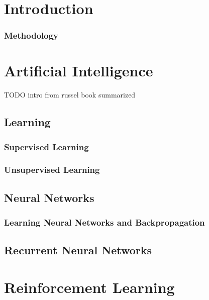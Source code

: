 \chapter{Introduction}

\subsection{Methodology}


\chapter{Artificial Intelligence}

 TODO intro from russel book summarized 
\section{Learning}

\subsection{Supervised Learning}

\subsection{Unsupervised Learning}

\section{Neural Networks}%
\label{sec:neural_networks}

\subsection{Learning Neural Networks and Backpropagation}
\label{sec:Backpropagation}


\section{Recurrent Neural Networks}%
\label{sec:recurrent_neural_networks}


\chapter{Reinforcement Learning}


